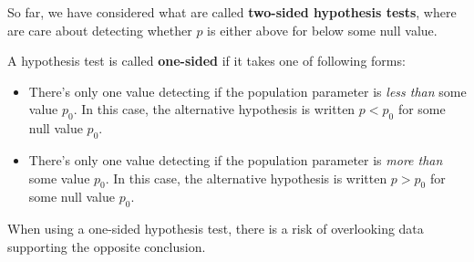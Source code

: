 \documentclass{beamer}
\begin{document}
\begin{frame}
  \begin{note}
    So far, we have considered what are called \textbf{two-sided hypothesis tests}, where are care about detecting whether $p$ is either above for below some null value.
  \end{note}\pause

  \begin{definition}
    A hypothesis test is called \textbf{one-sided} if it takes one of following forms:\pause
    \begin{itemize}
    \item There's only one value detecting if the population parameter is \emph{less than} some value $p_0$. In this case, the alternative hypothesis is written $p<p_0$ for some null value $p_0$.\pause
    \item There's only one value detecting if the population parameter is \emph{more than} some value $p_0$. In this case, the alternative hypothesis is written $p>p_0$ for some null value $p_0$.\pause
    \end{itemize}
  \end{definition}

  \begin{note}
    When using a one-sided hypothesis test, there is a risk of overlooking data supporting the opposite conclusion.
  \end{note}
\end{frame}
\end{document}
